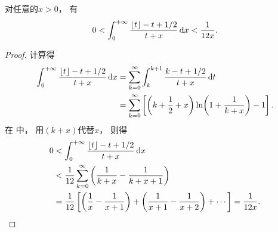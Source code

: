 \begin{lemma}\label{theorem:定积分.伽马函数的斯特灵近似.引理2}
对任意的\(x>0\)，
有\begin{equation}\label{equation:定积分.伽马函数的斯特灵近似.引理2}
	0 < \int_0^{+\infty} \frac{\lfloor t\rfloor - t + 1/2}{t + x} \dd{x} < \frac{1}{12 x}.
\end{equation}
\begin{proof}
计算得\begin{align*}
	\int_0^{+\infty} \frac{\lfloor t\rfloor - t + 1/2}{t + x} \dd{x}
	&= \sum\limits_{k=0}^\infty \int_k^{k+1} \frac{k - t + 1/2}{t + x} \dd{t} \\
	&= \sum\limits_{k=0}^\infty \left[
	\left(k + \frac{1}{2} + x\right) \ln(1 + \frac{1}{k + x}) - 1
	\right].
\end{align*}
在  中，
用\((k+x)\)代替\(x\)，
则得\begin{align*}
	0 &< \int_0^{+\infty} \frac{\lfloor t\rfloor - t + 1/2}{t + x} \dd{x} \\
	&< \frac{1}{12} \sum\limits_{k=0}^\infty \left(\frac{1}{k+x}
		- \frac{1}{k+x+1}\right) \\
	&= \frac{1}{12} \left[
		\left(\frac{1}{x} - \frac{1}{x+1}\right)
		+ \left(\frac{1}{x+1} - \frac{1}{x+2}\right) + \dotsb
	\right]
	= \frac{1}{12x}.
	\qedhere
\end{align*}
\end{proof}
\end{lemma}

